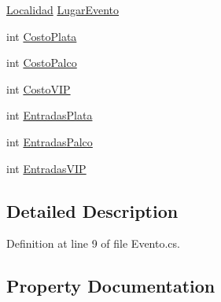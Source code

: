\begin{DoxyCompactItemize}
\item 
\hyperlink{classprj_progra_i_i_i_1_1_layer_1_1_entities_1_1_localidad}{Localidad} \hyperlink{classprj_progra_i_i_i_1_1_layer_1_1_entities_1_1_evento_ad7671027bd2f81cee1865e1e77839ab0}{Lugar\+Evento}
\item 
int \hyperlink{classprj_progra_i_i_i_1_1_layer_1_1_entities_1_1_evento_a925de33f44eda9945eea38334f63ea03}{Costo\+Plata}
\item 
int \hyperlink{classprj_progra_i_i_i_1_1_layer_1_1_entities_1_1_evento_ad91881d10e4aaef3f306a1117483c04c}{Costo\+Palco}
\item 
int \hyperlink{classprj_progra_i_i_i_1_1_layer_1_1_entities_1_1_evento_ac36788cac321bc3424a999099efd89e1}{Costo\+V\+IP}
\item 
int \hyperlink{classprj_progra_i_i_i_1_1_layer_1_1_entities_1_1_evento_aa2fca6211711f200359dc77522fbadc8}{Entradas\+Plata}
\item 
int \hyperlink{classprj_progra_i_i_i_1_1_layer_1_1_entities_1_1_evento_a1be1f4e470cac1ad33a2db93a0b70048}{Entradas\+Palco}
\item 
int \hyperlink{classprj_progra_i_i_i_1_1_layer_1_1_entities_1_1_evento_af3f6f0f3512e0cc4dd0f24f4dd173b16}{Entradas\+V\+IP}
\end{DoxyCompactItemize}


\subsection{Detailed Description}


Definition at line 9 of file Evento.\+cs.



\subsection{Property Documentation}
\hypertarget{classprj_progra_i_i_i_1_1_layer_1_1_entities_1_1_evento_ab043e4dbaadd5c8de1f6f4f699840ba7}{}\label{classprj_progra_i_i_i_1_1_layer_1_1_entities_1_1_evento_ab043e4dbaadd5c8de1f6f4f699840ba7} 
